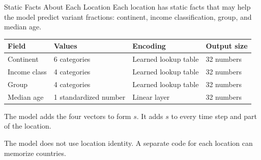 \begin{frame}{Static Facts About Each Location}
Each location has static facts that may help the model predict variant fractions: continent, income classification, group, and median age.
\par\medskip
\begin{center}
\small
\begin{tabular}{llll}
\hline
Field & Values & Encoding & Output size \\\hline
Continent & 6 categories & Learned lookup table & 32 numbers \\
Income class & 4 categories & Learned lookup table & 32 numbers \\
Group & 4 categories & Learned lookup table & 32 numbers \\
Median age & 1 standardized number & Linear layer & 32 numbers \\
\hline
\end{tabular}
\end{center}
\medskip
The model adds the four vectors to form $s$. It adds $s$ to every time step and part of the location.
\par\medskip
The model does not use location identity. A separate code for each location can memorize countries.
\par\smallskip
{}
\end{frame}
